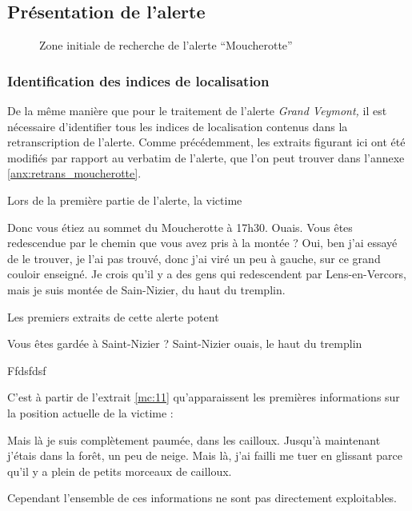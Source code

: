 
\subsection{Présentation de l'alerte}
\label{subsec:9-3-1}




\begin{figure}
  \centering
  
  \caption{Zone initiale de recherche de l'alerte
    \enquote{Moucherotte}}
  \label{fig:zir_moucherotte}
\end{figure}

\subsubsection{Identification des indices de localisation}
\label{subsec:9-3-1-1}

De la même manière que pour le traitement de l'alerte \emph{Grand
  Veymont,} il est nécessaire d'identifier tous les indices de
localisation contenus dans la retranscription de l'alerte. Comme
précédemment, les extraits figurant ici ont été modifiés par rapport
au verbatim de l'alerte, que l'on peut trouver dans l'annexe
\ref{anx:retrans_moucherotte}.


Lors de la première partie de l'alerte, la victime
%
\begin{dialogue*}
  \Sec {} Donc vous étiez au sommet du Moucherotte à 17h30.
  \Req {} Ouais.
  \Sec {} Vous êtes redescendue par le chemin que
  vous avez pris à la montée ?
  \Req {} Oui, ben j’ai essayé de le trouver, je l’ai pas
  trouvé,  donc j’ai viré un peu à gauche,
   sur ce grand couloir enseigné.  Je
  crois qu’il y a des gens qui redescendent par Lens-en-Vercors,
   mais je suis montée de Sain-Nizier, du haut du
  tremplin.
\end{dialogue*}
% 
Les premiers extraits de cette alerte potent

\begin{dialogue*}
  \Sec {} Vous êtes gardée à Saint-Nizier ?
  \Req {} Saint-Nizier ouais, le haut du tremplin
\end{dialogue*}
% 
Ffdsfdsf

C'est à partir de l'extrait \ref{mc:11} qu'apparaissent les premières
informations sur la position actuelle de la victime :
%
\begin{dialogue*}
  \Req {} Mais là je suis complètement paumée,
   dans les cailloux.  Jusqu’à
  maintenant j’étais dans la forêt,  un peu de
  neige.  Mais là, j’ai failli me tuer en glissant
   parce qu’il y a plein de petits morceaux de
  cailloux.
\end{dialogue*}
% 
Cependant l'ensemble de ces informations ne sont pas directement
exploitables.

